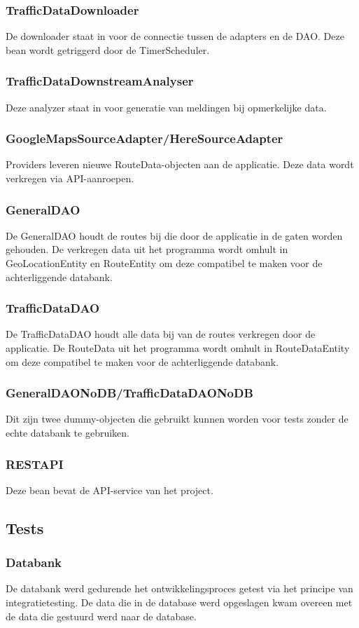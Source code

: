 \documentclass[ps,a4paper,oneside]{report}
\begin{document}
\subsubsection{TrafficDataDownloader}
De downloader staat in voor de connectie tussen de adapters en de DAO. Deze bean wordt getriggerd door de TimerScheduler.
\subsubsection{TrafficDataDownstreamAnalyser}
Deze analyzer staat in voor generatie van meldingen bij opmerkelijke data.
\subsubsection{GoogleMapsSourceAdapter/HereSourceAdapter}
Providers leveren nieuwe RouteData-objecten aan de applicatie. Deze data wordt verkregen via API-aanroepen.
\subsubsection{GeneralDAO}
De GeneralDAO houdt de routes bij die door de applicatie in de gaten worden gehouden. De verkregen data uit het programma wordt omhult in GeoLocationEntity en RouteEntity om deze compatibel te maken voor de achterliggende databank.
\subsubsection{TrafficDataDAO}
De TrafficDataDAO houdt alle data bij van de routes verkregen door de applicatie. De RouteData uit het programma wordt omhult in RouteDataEntity om deze compatibel te maken voor de achterliggende databank.
\subsubsection{GeneralDAONoDB/TrafficDataDAONoDB}
Dit zijn twee dummy-objecten die gebruikt kunnen worden voor tests zonder de echte databank te gebruiken.
\subsubsection{RESTAPI}
Deze bean bevat de API-service van het project.
\subsection{Tests}
\subsubsection{Databank}
De databank werd gedurende het ontwikkelingsproces getest via het principe van integratietesting. De data die in de database werd opgeslagen kwam overeen met de data die gestuurd werd naar de database.
\end{document}
